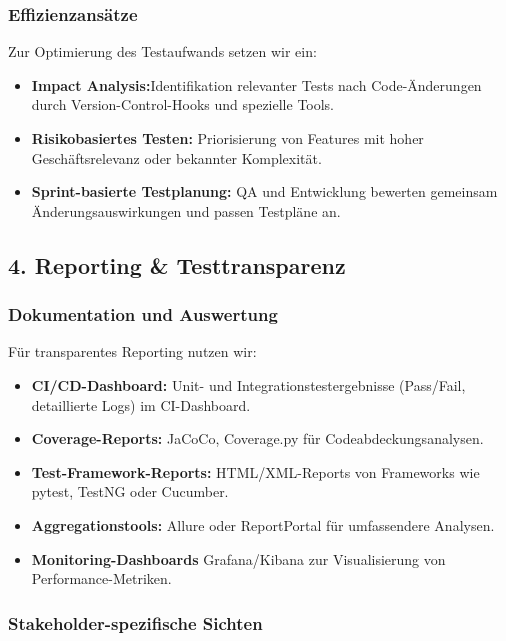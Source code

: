 \subsubsection{Effizienzansätze}
Zur Optimierung des Testaufwands setzen wir ein:

\begin{itemize}
    \item \textbf{Impact Analysis:}Identifikation relevanter Tests nach Code-Änderungen durch
    Version-Control-Hooks und spezielle Tools.
    \item \textbf{Risikobasiertes Testen:} Priorisierung von Features mit hoher Geschäftsrelevanz
    oder bekannter Komplexität.
    \item \textbf{Sprint-basierte Testplanung:} QA und Entwicklung bewerten gemeinsam
    Änderungsauswirkungen und passen Testpläne an.
\end{itemize}

\subsection{4. Reporting \& Testtransparenz}

\subsubsection{Dokumentation und Auswertung}
Für transparentes Reporting nutzen wir:

\begin{itemize}
    \item \textbf{CI/CD-Dashboard:} Unit- und Integrationstestergebnisse
    (Pass/Fail, detaillierte Logs) im CI-Dashboard.
    \item \textbf{Coverage-Reports:} JaCoCo, Coverage.py für Codeabdeckungsanalysen.
    \item \textbf{Test-Framework-Reports:} HTML/XML-Reports von Frameworks wie pytest, TestNG
    oder Cucumber.
    \item \textbf{Aggregationstools:} Allure oder ReportPortal für umfassendere Analysen.
    \item \textbf{Monitoring-Dashboards} Grafana/Kibana zur Visualisierung von Performance-Metriken.
\end{itemize}

\subsubsection{Stakeholder-spezifische Sichten}

